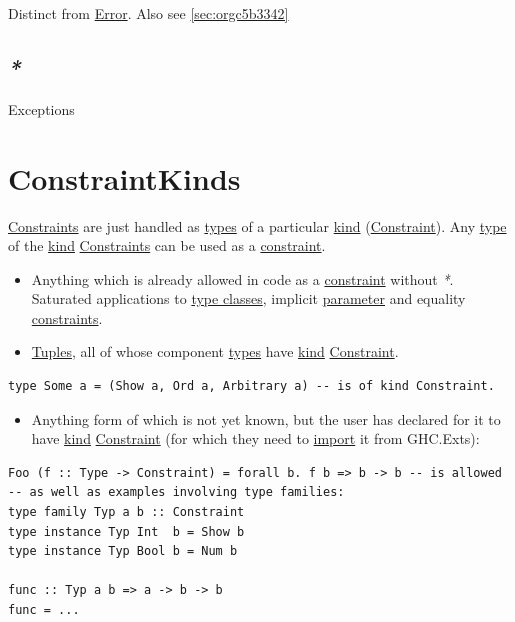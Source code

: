 \documentclass[a4paper,14pt,oneside]{book}
\begin{document}
Distinct from \hyperref[org047dcef]{Error}. Also see \ref{sec:orgc5b3342}

\section{\emph{*}}
\label{sec:org19d9f56}

\label{org1e11eb9}Exceptions

\chapter{\label{org90b4080}ConstraintKinds}
\label{sec:org5eb59bb}
\hyperref[org9abcbdb]{Constraints} are just handled as \hyperref[org308c412]{types} of a particular \hyperref[org2c7c432]{kind} (\hyperref[org93d9525]{Constraint}).
Any \hyperref[org15306ef]{type} of the \hyperref[org2c7c432]{kind} \hyperref[org9abcbdb]{Constraints} can be used as a \hyperref[org93d9525]{constraint}.
\begin{itemize}
\item Anything which is already allowed in code as a \hyperref[org93d9525]{constraint} without \emph{*}. Saturated applications to \hyperref[org9b550bc]{type classes}, implicit \hyperref[org578837b]{parameter} and equality \hyperref[org9abcbdb]{constraints}.
\item \hyperref[orgd0fe20a]{Tuples}, all of whose component \hyperref[org308c412]{types} have \hyperref[org2c7c432]{kind} \hyperref[org93d9525]{Constraint}.
\end{itemize}
\begin{verbatim}
type Some a = (Show a, Ord a, Arbitrary a) -- is of kind Constraint.
\end{verbatim}
\begin{itemize}
\item Anything form of which is not yet known, but the user has declared for it to have \hyperref[org2c7c432]{kind} \hyperref[org93d9525]{Constraint} (for which they need to \hyperref[orgcee18a0]{import} it from GHC.Exts):
\end{itemize}
\begin{verbatim}
Foo (f :: Type -> Constraint) = forall b. f b => b -> b -- is allowed
-- as well as examples involving type families:
type family Typ a b :: Constraint
type instance Typ Int  b = Show b
type instance Typ Bool b = Num b

func :: Typ a b => a -> b -> b
func = ...
\end{verbatim}
\end{document}
